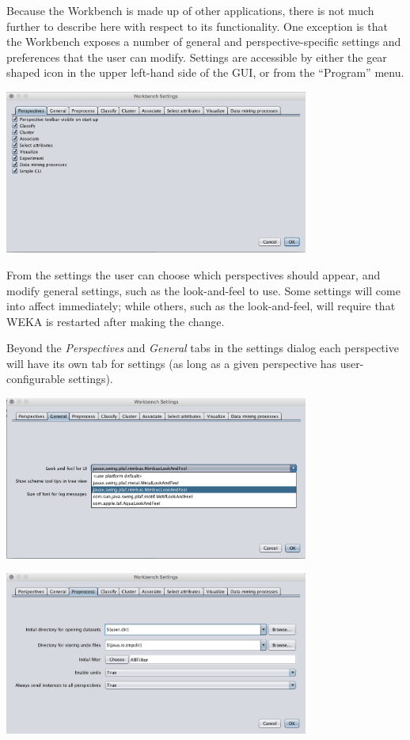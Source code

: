 Because the Workbench is made up of other applications, there is not
much further to describe here with respect to its functionality. One
exception is that the Workbench exposes a number of general and
perspective-specific settings and preferences that the user can
modify. Settings are accessible by either the gear shaped icon in the
upper left-hand side of the GUI, or from the ``Program'' menu.

\begin{center}
  \includegraphics[width=10cm]{images/workbench/settings.eps}
\end{center}

From the settings the user can choose which perspectives should appear, and
modify general settings, such as the look-and-feel to use. Some settings
will come into affect immediately; while others, such as the look-and-feel,
will require that WEKA is restarted after making the change.

Beyond the \textit{Perspectives} and \textit{General} tabs in the settings
dialog each perspective will have its own tab for settings (as long as
a given perspective has user-configurable settings).

\begin{center}
  \includegraphics[width=10cm]{images/workbench/settings2.eps}
\end{center}

\begin{center}
  \includegraphics[width=10cm]{images/workbench/settings3.eps}
\end{center}
